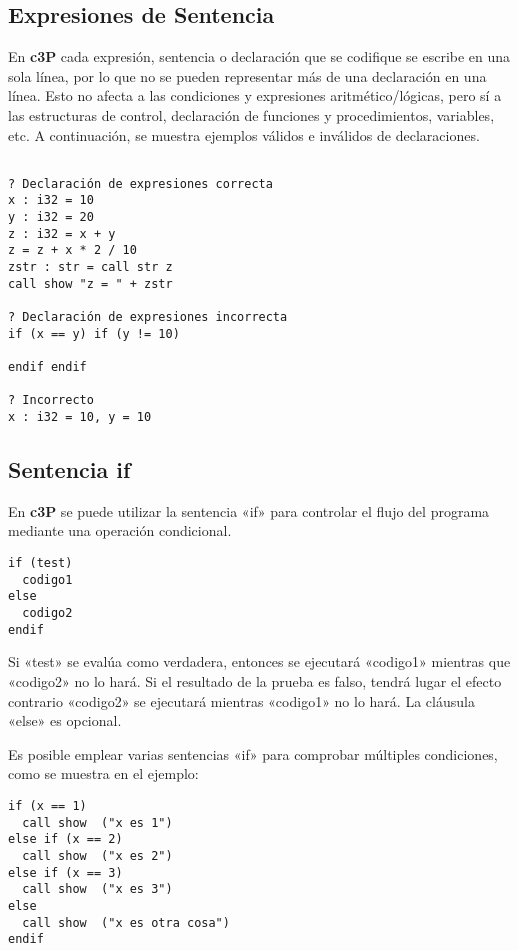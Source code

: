 \subsection{Expresiones de Sentencia}

En \textbf{c3P} cada expresión, sentencia o declaración que se codifique se escribe en una sola
línea, por lo que no se pueden representar más de una declaración en una línea. Esto
no afecta a las condiciones y expresiones aritmético/lógicas, pero sí a las estructuras
de control, declaración de funciones y procedimientos, variables, etc. A continuación,
se muestra ejemplos válidos e inválidos de declaraciones.

\begin{verbatim}

? Declaración de expresiones correcta
x : i32 = 10
y : i32 = 20
z : i32 = x + y
z = z + x * 2 / 10
zstr : str = call str z
call show "z = " + zstr

? Declaración de expresiones incorrecta
if (x == y) if (y != 10)

endif endif

? Incorrecto
x : i32 = 10, y = 10
\end{verbatim}

\subsection{Sentencia if}

En \textbf{c3P} se puede utilizar la sentencia «if» para controlar el flujo del programa mediante una operación condicional.

\begin{verbatim}
if (test)
  codigo1
else
  codigo2
endif
\end{verbatim}

Si «test» se evalúa como verdadera, entonces se ejecutará «codigo1» mientras que «codigo2» no lo hará. Si el resultado de la prueba es falso, tendrá lugar el efecto contrario «codigo2» se ejecutará mientras «codigo1» no lo hará. La cláusula «else» es opcional.

Es posible emplear varias sentencias «if» para comprobar múltiples condiciones, como se muestra en el ejemplo:

\begin{verbatim}
if (x == 1)
  call show  ("x es 1")
else if (x == 2)
  call show  ("x es 2")
else if (x == 3)
  call show  ("x es 3")
else
  call show  ("x es otra cosa")
endif
\end{verbatim}

